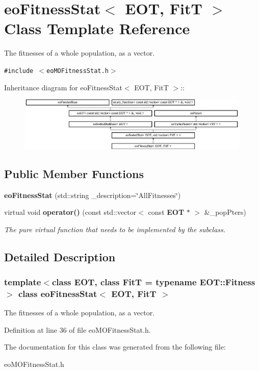 \section{eo\-Fitness\-Stat$<$ EOT, Fit\-T $>$ Class Template Reference}
\label{classeo_fitness_stat}
The fitnesses of a whole population, as a vector.  


{\tt \#include $<$eo\-MOFitness\-Stat.h$>$}

Inheritance diagram for eo\-Fitness\-Stat$<$ EOT, Fit\-T $>$::\begin{figure}[H]
\begin{center}
\leavevmode
\includegraphics[height=2.55708cm]{classeo_fitness_stat}
\end{center}
\end{figure}
\subsection*{Public Member Functions}
\begin{CompactItemize}
\item 
{\bf eo\-Fitness\-Stat} (std::string \_\-description=\char`\"{}All\-Fitnesses\char`\"{})\label{classeo_fitness_stat_a0}

\item 
virtual void {\bf operator()} (const std::vector$<$ const {\bf EOT} $\ast$ $>$ \&\_\-pop\-Pters)\label{classeo_fitness_stat_a1}

\begin{CompactList}\small\item\em The pure virtual function that needs to be implemented by the subclass. \item\end{CompactList}\end{CompactItemize}


\subsection{Detailed Description}
\subsubsection*{template$<$class EOT, class Fit\-T = typename EOT::Fitness$>$ class eo\-Fitness\-Stat$<$ EOT, Fit\-T $>$}

The fitnesses of a whole population, as a vector. 



Definition at line 36 of file eo\-MOFitness\-Stat.h.

The documentation for this class was generated from the following file:\begin{CompactItemize}
\item 
eo\-MOFitness\-Stat.h\end{CompactItemize}
